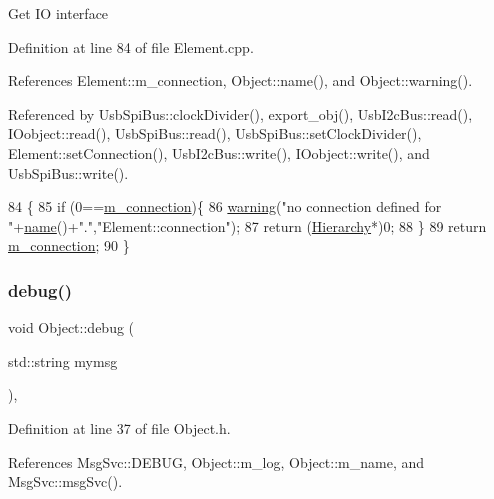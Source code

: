 Get IO interface 

Definition at line 84 of file Element.\+cpp.



References Element\+::m\+\_\+connection, Object\+::name(), and Object\+::warning().



Referenced by Usb\+Spi\+Bus\+::clock\+Divider(), export\+\_\+obj(), Usb\+I2c\+Bus\+::read(), I\+Oobject\+::read(), Usb\+Spi\+Bus\+::read(), Usb\+Spi\+Bus\+::set\+Clock\+Divider(), Element\+::set\+Connection(), Usb\+I2c\+Bus\+::write(), I\+Oobject\+::write(), and Usb\+Spi\+Bus\+::write().


\begin{DoxyCode}
84                               \{
85   \textcolor{keywordflow}{if} (0==\hyperlink{classElement_abe3de7a5dbbc9a6dd2d7e012e5fdb266}{m\_connection})\{
86     \hyperlink{classObject_a65cd4fda577711660821fd2cd5a3b4c9}{warning}(\textcolor{stringliteral}{"no connection defined for "}+\hyperlink{classObject_a300f4c05dd468c7bb8b3c968868443c1}{name}()+\textcolor{stringliteral}{"."},\textcolor{stringliteral}{"Element::connection"});
87     \textcolor{keywordflow}{return} (\hyperlink{classHierarchy}{Hierarchy}*)0;
88   \}
89   \textcolor{keywordflow}{return} \hyperlink{classElement_abe3de7a5dbbc9a6dd2d7e012e5fdb266}{m\_connection};
90 \}
\end{DoxyCode}
\mbox{\label{classObject_aac010553f022165573714b7014a15f0d}} 
\subsubsection{\texorpdfstring{debug()}{debug()}\hspace{0.1cm}{\footnotesize\ttfamily [1/2]}}
{\footnotesize\ttfamily void Object\+::debug (\begin{DoxyParamCaption}\item[{std\+::string}]{mymsg }\end{DoxyParamCaption})\hspace{0.3cm}{\ttfamily [inline]}, {\ttfamily [inherited]}}



Definition at line 37 of file Object.\+h.



References Msg\+Svc\+::\+D\+E\+B\+UG, Object\+::m\+\_\+log, Object\+::m\+\_\+name, and Msg\+Svc\+::msg\+Svc().



